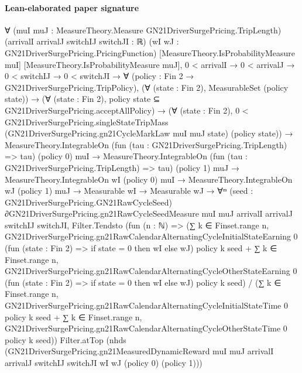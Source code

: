 \documentclass[10pt]{article}
\begin{document}
\paragraph{Lean-elaborated paper signature}
\begin{ReviewVerbatim}
∀ (muI muJ : MeasureTheory.Measure GN21DriverSurgePricing.TripLength) (arrivalI arrivalJ switchIJ switchJI : ℝ)
  (wI wJ : GN21DriverSurgePricing.PricingFunction) [MeasureTheory.IsProbabilityMeasure muI]
  [MeasureTheory.IsProbabilityMeasure muJ],
  0 < arrivalI →
    0 < arrivalJ →
      0 < switchIJ →
        0 < switchJI →
          ∀ (policy : Fin 2 → GN21DriverSurgePricing.TripPolicy),
            (∀ (state : Fin 2), MeasurableSet (policy state)) →
              (∀ (state : Fin 2), policy state ⊆ GN21DriverSurgePricing.acceptAllPolicy) →
                (∀ (state : Fin 2),
                    0 <
                      GN21DriverSurgePricing.singleStateTripMass (GN21DriverSurgePricing.gn21CycleMarkLaw muI muJ state)
                        (policy state)) →
                  MeasureTheory.IntegrableOn (fun (tau : GN21DriverSurgePricing.TripLength) => tau) (policy 0) muI →
                    MeasureTheory.IntegrableOn (fun (tau : GN21DriverSurgePricing.TripLength) => tau) (policy 1) muJ →
                      MeasureTheory.IntegrableOn wI (policy 0) muI →
                        MeasureTheory.IntegrableOn wJ (policy 1) muJ →
                          Measurable wI →
                            Measurable wJ →
                              ∀ᵐ (seed :
                                GN21DriverSurgePricing.GN21RawCycleSeed) ∂GN21DriverSurgePricing.gn21RawCycleSeedMeasure
                                  muI muJ arrivalI arrivalJ switchIJ switchJI,
                                Filter.Tendsto
                                  (fun (n : ℕ) =>
                                    (∑ k ∈ Finset.range n,
                                          GN21DriverSurgePricing.gn21RawCalendarAlternatingCycleInitialStateEarning 0
                                            (fun (state : Fin 2) => if state = 0 then wI else wJ) policy k seed +
                                        ∑ k ∈ Finset.range n,
                                          GN21DriverSurgePricing.gn21RawCalendarAlternatingCycleOtherStateEarning 0
                                            (fun (state : Fin 2) => if state = 0 then wI else wJ) policy k seed) /
                                      (∑ k ∈ Finset.range n,
                                          GN21DriverSurgePricing.gn21RawCalendarAlternatingCycleInitialStateTime 0
                                            policy k seed +
                                        ∑ k ∈ Finset.range n,
                                          GN21DriverSurgePricing.gn21RawCalendarAlternatingCycleOtherStateTime 0 policy
                                            k seed))
                                  Filter.atTop
                                  (nhds
                                    (GN21DriverSurgePricing.gn21MeasuredDynamicReward muI muJ arrivalI arrivalJ switchIJ
                                      switchJI wI wJ (policy 0) (policy 1)))
\end{ReviewVerbatim}
\end{document}
